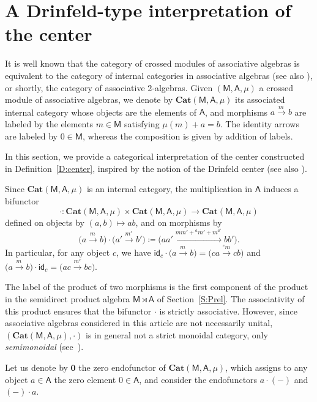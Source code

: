 \documentclass[12pt,reqno]{amsart}
\theoremstyle{plain}
\theoremstyle{definition}
\theoremstyle{remark}
\newcommand{\A}{\ensuremath{\mathsf{A}}}
\newcommand{\id}{\ensuremath{\mathsf{id}}}
\newcommand{\MM}{\ensuremath{\mathsf{M}}}
\newcommand{\Cat}{\ensuremath{\mathbf{Cat}}}
\numberwithin{equation}{section}
\begin{document}

\section{A Drinfeld-type interpretation of the center} \label{S:Drin}
It is well known that the category of crossed modules of associative algebras is equivalent to the category of internal categories in associative algebras \cite[Theorem~3.5]{Emz}
 (see also \cite[Proposition~1.1]{FFL1}), or shortly, the category of associative 2-algebras. Given $(\MM,\A,\mu)$ a crossed module of associative algebras,
  we denote by $\Cat(\MM,\A,\mu)$ its associated internal category whose objects are the elements of $\A$, 
  and morphisms $a\xrightarrow{m \,}b$ are labeled by the elements $m\in \MM$ satisfying $\mu(m)+a=b$. The identity arrows are labeled by $0\in\MM$, whereas the composition is given by addition of labels. 

In this section, we provide a categorical interpretation of the center constructed in Definition~\ref{D:center}, inspired by the notion of the Drinfeld center \cite{Ma} (see also \cite[Section~7.13]{EGNO}). 

Since $\Cat(\MM,\A,\mu)$ is an internal category, the multiplication in $\A$ induces a bifunctor
 \[\cdot\colon \Cat(\MM,\A,\mu)\times \Cat(\MM,\A,\mu)\longrightarrow\Cat(\MM,\A,\mu)\]
  defined on objects by $(a,b)\mapsto ab$, and on morphisms by
\[\big(a\xrightarrow{m\,}b\big)\cdot\big(a'\xrightarrow{m' \,}b'\big)\coloneqq \big(aa'\xrightarrow{mm'+{}^{a}m'+m^{a'}}bb'\big).\]
In particular, for any object $c$, we have $\id_c \cdot \big(a\xrightarrow{m\,}b\big)=\big(ca\xrightarrow{{}^{c}m}cb\big)$ and $\big(a\xrightarrow{m\,}b\big) \cdot\id_c =\big(ac\xrightarrow{m^c}bc\big)$.

The label of the product of two morphisms is the first component of the product in the semidirect product algebra $\MM\rtimes\A$ of Section~\ref{S:Prel}.
 The associativity of this product ensures that the bifunctor $\cdot$ is strictly associative. However, since associative algebras considered in this article are not necessarily unital,
  $(\Cat(\MM,\A,\mu),\cdot)$ is in general not a strict monoidal category, only \emph{semimonoidal} (see~\cite{JK}).

Let us denote by $\mathbf{0}$ the zero endofunctor of $\Cat(\MM,\A,\mu)$, which assigns to any object $a\in\A$ the zero element $0\in\A$, and consider the endofunctors $a\cdot (-)$ and $(-)\cdot a$.
\end{document}
